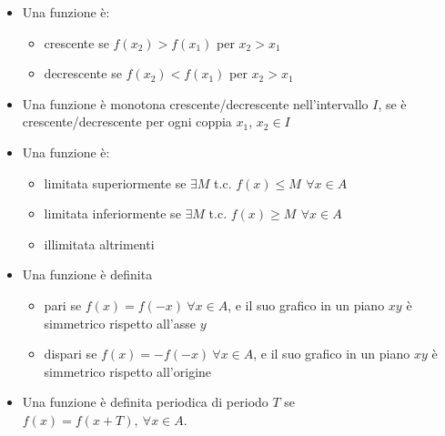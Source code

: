 \documentclass[letterpaper,10pt,italian]{jupyterBook}
\begin{document}
\begin{itemize}
\item {} 
\sphinxAtStartPar
{} Una funzione è:
\begin{itemize}
\item {} 
\sphinxAtStartPar
crescente se \(f(x_2) > f(x_1)\) per  \(x_2 > x_1\)

\item {} 
\sphinxAtStartPar
decrescente se \(f(x_2) < f(x_1)\) per  \(x_2 > x_1\)

\end{itemize}

\item {} 
\sphinxAtStartPar
{} Una funzione è monotona crescente/decrescente nell’intervallo \(I\), se è crescente/decrescente per ogni coppia \(x_1\), \(x_2 \in I\)

\item {} 
\sphinxAtStartPar
{} Una funzione è:
\begin{itemize}
\item {} 
\sphinxAtStartPar
limitata superiormente se \(\exists M\) t.c. \(f(x) \le M \, \ \forall x \in A\)

\item {} 
\sphinxAtStartPar
limitata inferiormente se \(\exists M\) t.c. \(f(x) \ge M \, \ \forall x \in A\)

\item {} 
\sphinxAtStartPar
illimitata altrimenti

\end{itemize}

\item {} 
\sphinxAtStartPar
{} Una funzione è definita
\begin{itemize}
\item {} 
\sphinxAtStartPar
pari se \(f(x) = f(-x) \ \forall x \in A\), e il suo grafico in un piano \(x\)\sphinxhyphen{}\(y\) è simmetrico rispetto all’asse \(y\)

\item {} 
\sphinxAtStartPar
dispari se \(f(x) =-f(-x) \ \forall x \in A\), e il suo grafico in un piano \(x\)\sphinxhyphen{}\(y\) è simmetrico rispetto all’origine

\end{itemize}

\item {} 
\sphinxAtStartPar
{} Una funzione è definita periodica di periodo \(T\) se \(f(x) = f(x+T), \ \forall x \in A\).


\end{itemize}
\end{document}
